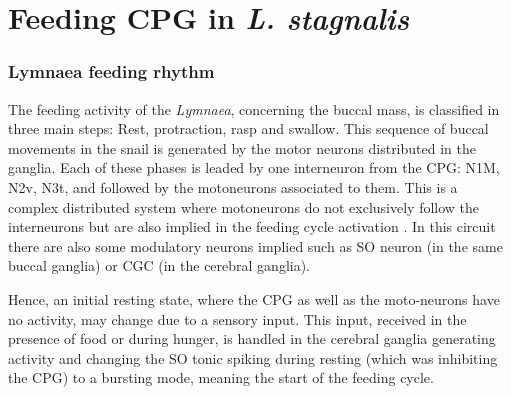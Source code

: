 

\section{Feeding CPG in \textit{L. stagnalis}}
%


\subsubsection{Lymnaea feeding rhythm}

The feeding activity of the \textit{Lymnaea}, concerning the buccal mass, is classified in three main steps: Rest, protraction, rasp and swallow. This sequence of buccal movements in the snail is generated by the motor neurons distributed in the ganglia. Each of these phases is leaded by one interneuron from the CPG: N1M, N2v, N3t, and followed by the motoneurons associated to them. This is a complex distributed system where motoneurons do not exclusively follow the interneurons but are also implied in the feeding cycle activation \cite{staras_pattern-generating_1998}. In this circuit there are also some modulatory neurons implied such as SO neuron (in the same buccal ganglia) or CGC (in the cerebral ganglia). 

Hence, an initial resting state, where the CPG as well as the moto-neurons have no activity, may change due to a sensory input. This input, received in the presence of food or during hunger, is handled in the cerebral ganglia generating activity and changing the SO tonic spiking during resting (which was inhibiting the CPG) to a bursting mode, meaning the start of the feeding cycle.



